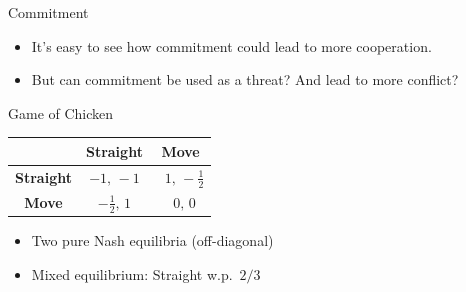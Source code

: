 \documentclass[aspectratio=169, handout]{beamer}
\begin{document}
\begin{frame}{Commitment}
\pause
\begin{itemize}
    \item It's easy to see how commitment could lead to more cooperation. \pause
    \item But can commitment be used as a threat? And lead to more conflict? \parencite[]{kokotajlo_commitment_2019}
\end{itemize}


\end{frame}
\begin{frame}{Game of Chicken}
\pause
\centering
\renewcommand{\arraystretch}{1.2}
\begin{tabular}{c|cc}
           & \textbf{Straight} & \textbf{Move} \\ \hline
\textbf{Straight} & $-1,\,-1$ & $\;\;1,\,-\tfrac12$ \\[2pt]
\textbf{Move}   & $-\tfrac12,\,1$ & $\;\;0,\,0$
\end{tabular}
\medskip
\pause
\begin{itemize}
  \item Two pure Nash equilibria (off-diagonal)
  \item Mixed equilibrium: Straight w.p.\ $2/3$
\end{itemize}
\end{frame}
\end{document}

